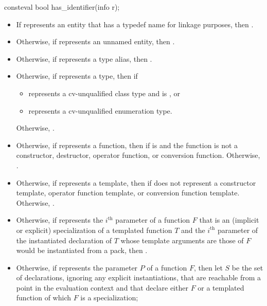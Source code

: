%
\begin{itemdecl}
consteval bool has_identifier(info r);
\end{itemdecl}

\begin{itemdescr}
\pnum
\returns
\begin{itemize}
\item
  If  represents an entity
  that has a typedef name for linkage purposes,
  then .
\item
  Otherwise, if  represents an unnamed entity,
  then .
\item
  Otherwise, if  represents a type alias,
  then .
\item
  Otherwise, if  represents a type,
  then  if
  \begin{itemize}
  \item
     represents a cv-unqualified class type and
     is , or
  \item
     represents a cv-unqualified enumeration type.
  \end{itemize}
  Otherwise, .
\item
  Otherwise, if  represents a function,
  then  if  is 
  and the function is not a
  constructor,
  destructor,
  operator function, or
  conversion function.
  Otherwise, .
\item
  Otherwise, if  represents a template,
  then  if  does not represent a
  constructor template,
  operator function template,
  or conversion function template.
  Otherwise, .
\item
  Otherwise, if  represents the $i^\text{th}$ parameter of a function $F$
  that is an (implicit or explicit) specialization of a templated function $T$
  and the $i^\text{th}$ parameter of the instantiated declaration of $T$
  whose template arguments are those of $F$ would be instantiated from a pack,
  then .
\item
  Otherwise, if  represents the parameter $P$ of  a function $F$,
  then let $S$ be the set of declarations,
  ignoring any explicit instantiations,
  that are reachable from a point in the evaluation context
  and that declare either $F$ or a templated function
  of which $F$ is a specialization;

\end{itemize}
\end{itemdescr}
